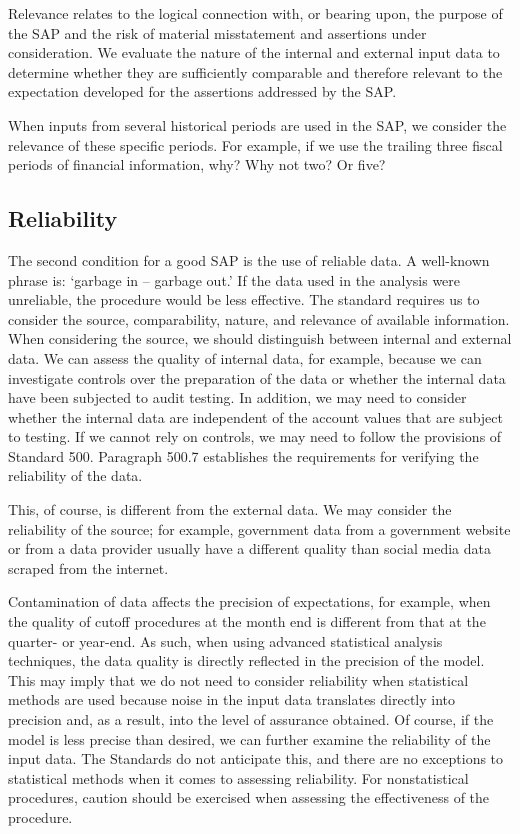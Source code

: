 Relevance relates to the logical connection with, or bearing upon, the purpose of the SAP and the risk of material misstatement and assertions under consideration. We evaluate the nature of the internal and external input data to determine whether they are sufficiently comparable and therefore relevant to the expectation developed for the assertions addressed by the SAP.

When inputs from several historical periods are used in the SAP, we consider the relevance of these specific periods. For example, if we use the trailing three fiscal periods of financial information, why? Why not two? Or five?


\subsection{Reliability} %
\label{sub:reliability}

The second condition for a good SAP is the use of reliable data. A well-known phrase is: ‘garbage in -- garbage out.’ If the data used in the analysis were unreliable, the procedure would be less effective. The standard requires us to consider the source, comparability, nature, and relevance of available information. When considering the source, we should distinguish between internal and external data. We can assess the quality of internal data, for example, because we can investigate controls over the preparation of the data or whether the internal data have been subjected to audit testing. In addition, we may need to consider whether the internal data are independent of the account values that are subject to testing. If we cannot rely on controls, we may need to follow the provisions of Standard 500. Paragraph 500.7 establishes the requirements for verifying the reliability of the data. 

This, of course, is different from the external data. We may consider the reliability of the source; for example, government data from a government website or from a data provider usually have a different quality than social media data scraped from the internet.

Contamination of data affects the precision of expectations, for example, when the quality of cutoff procedures at the month end is different from that at the quarter- or year-end. As such, when using advanced statistical analysis techniques, the data quality is directly reflected in the precision of the model. This may imply that we do not need to consider reliability when statistical methods are used because noise in the input data translates directly into precision and, as a result, into the level of assurance obtained. Of course, if the model is less precise than desired, we can further examine the reliability of the input data. The Standards do not anticipate this, and there are no exceptions to statistical methods when it comes to assessing reliability. For nonstatistical procedures, caution should be exercised when assessing the effectiveness of the procedure. 

